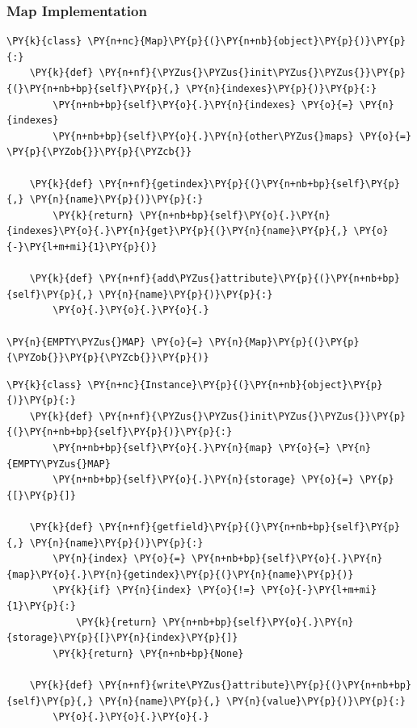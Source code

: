 \documentclass[utf8x]{beamer}
\begin{document}
\begin{frame}[containsverbatim]
\frametitle{Map Implementation}

\begin{Verbatim}[commandchars=\\\{\}]
\PY{k}{class} \PY{n+nc}{Map}\PY{p}{(}\PY{n+nb}{object}\PY{p}{)}\PY{p}{:}
    \PY{k}{def} \PY{n+nf}{\PYZus{}\PYZus{}init\PYZus{}\PYZus{}}\PY{p}{(}\PY{n+nb+bp}{self}\PY{p}{,} \PY{n}{indexes}\PY{p}{)}\PY{p}{:}
        \PY{n+nb+bp}{self}\PY{o}{.}\PY{n}{indexes} \PY{o}{=} \PY{n}{indexes}
        \PY{n+nb+bp}{self}\PY{o}{.}\PY{n}{other\PYZus{}maps} \PY{o}{=} \PY{p}{\PYZob{}}\PY{p}{\PYZcb{}}

    \PY{k}{def} \PY{n+nf}{getindex}\PY{p}{(}\PY{n+nb+bp}{self}\PY{p}{,} \PY{n}{name}\PY{p}{)}\PY{p}{:}
        \PY{k}{return} \PY{n+nb+bp}{self}\PY{o}{.}\PY{n}{indexes}\PY{o}{.}\PY{n}{get}\PY{p}{(}\PY{n}{name}\PY{p}{,} \PY{o}{-}\PY{l+m+mi}{1}\PY{p}{)}

    \PY{k}{def} \PY{n+nf}{add\PYZus{}attribute}\PY{p}{(}\PY{n+nb+bp}{self}\PY{p}{,} \PY{n}{name}\PY{p}{)}\PY{p}{:}
        \PY{o}{.}\PY{o}{.}\PY{o}{.}

\PY{n}{EMPTY\PYZus{}MAP} \PY{o}{=} \PY{n}{Map}\PY{p}{(}\PY{p}{\PYZob{}}\PY{p}{\PYZcb{}}\PY{p}{)}
\end{Verbatim}
\end{frame}

\begin{frame}
\begin{Verbatim}[commandchars=\\\{\}]
\PY{k}{class} \PY{n+nc}{Instance}\PY{p}{(}\PY{n+nb}{object}\PY{p}{)}\PY{p}{:}
    \PY{k}{def} \PY{n+nf}{\PYZus{}\PYZus{}init\PYZus{}\PYZus{}}\PY{p}{(}\PY{n+nb+bp}{self}\PY{p}{)}\PY{p}{:}
        \PY{n+nb+bp}{self}\PY{o}{.}\PY{n}{map} \PY{o}{=} \PY{n}{EMPTY\PYZus{}MAP}
        \PY{n+nb+bp}{self}\PY{o}{.}\PY{n}{storage} \PY{o}{=} \PY{p}{[}\PY{p}{]}

    \PY{k}{def} \PY{n+nf}{getfield}\PY{p}{(}\PY{n+nb+bp}{self}\PY{p}{,} \PY{n}{name}\PY{p}{)}\PY{p}{:}
        \PY{n}{index} \PY{o}{=} \PY{n+nb+bp}{self}\PY{o}{.}\PY{n}{map}\PY{o}{.}\PY{n}{getindex}\PY{p}{(}\PY{n}{name}\PY{p}{)}
        \PY{k}{if} \PY{n}{index} \PY{o}{!=} \PY{o}{-}\PY{l+m+mi}{1}\PY{p}{:}
            \PY{k}{return} \PY{n+nb+bp}{self}\PY{o}{.}\PY{n}{storage}\PY{p}{[}\PY{n}{index}\PY{p}{]}
        \PY{k}{return} \PY{n+nb+bp}{None}

    \PY{k}{def} \PY{n+nf}{write\PYZus{}attribute}\PY{p}{(}\PY{n+nb+bp}{self}\PY{p}{,} \PY{n}{name}\PY{p}{,} \PY{n}{value}\PY{p}{)}\PY{p}{:}
        \PY{o}{.}\PY{o}{.}\PY{o}{.}
\end{Verbatim}
\end{frame}
\end{document}

